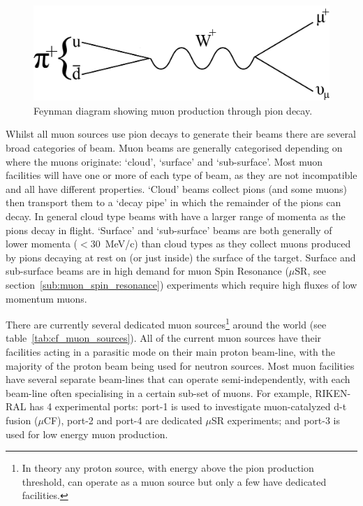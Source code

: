 \begin{figure}[hptb]
  \centering  
    \includegraphics[scale=0.8]{images/pion_decay_feyman.png}
  \caption{Feynman diagram showing muon production through pion decay.}
  \label{fig:pion_decay_feyman}
\end{figure}

Whilst all muon sources use pion decays to generate their beams there are several broad categories of beam. Muon beams are generally categorised depending on where the muons originate: `cloud', `surface' and `sub-surface'. Most muon facilities will have one or more of each type of beam, as they are not incompatible and all have different properties. `Cloud' beams collect pions (and some muons) then transport them to a `decay pipe' in which the remainder of the pions can decay. In general cloud type beams with have a larger range of momenta as the pions decay in flight. `Surface' and `sub-surface' beams are both generally of lower momenta (\( <30\)~MeV/c) than cloud types as they collect muons produced by pions decaying at rest on (or just inside) the surface of the target. Surface and sub-surface beams are in high demand for muon Spin Resonance (\(\mu\)SR, see section~\ref{sub:muon_spin_resonance}) experiments which require high fluxes of low momentum muons.

There are currently several dedicated muon sources\footnote{In theory any proton source, with energy above the pion production threshold, can operate as a muon source but only a few have dedicated facilities.} around the world (see table~\ref{tab:cf_muon_sources}). All of the current muon sources have their facilities acting in a parasitic mode on their main proton beam-line, with the majority of the proton beam being used for neutron sources. Most muon facilities have several separate beam-lines that can operate semi-independently, with each beam-line often specialising in a certain sub-set of muons. For example, RIKEN-RAL has 4 experimental ports: port-1 is used to investigate muon-catalyzed d-t fusion (\(\mu\)CF), port-2 and port-4 are dedicated \(\mu\)SR experiments; and port-3 is used for low energy muon production.

